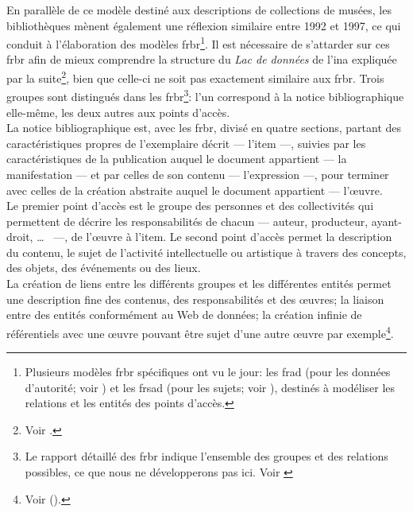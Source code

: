 En parallèle de ce modèle destiné aux descriptions de collections de musées, les bibliothèques mènent également une réflexion similaire entre 1992 et 1997, ce qui conduit à l'élaboration des modèles \ac{frbr}\footnote{Plusieurs modèles \ac{frbr} spécifiques ont vu le jour: les \ac{frad} (pour les données d'autorité; voir \cite{federation_internationale_des_associations_de_bibliothecaires_et_de_bibliotheques_fonctionnalites_2010}) et les \ac{frsad} (pour les sujets; voir \cite{federation_internationale_des_associations_de_bibliothecaires_et_de_bibliotheques_fonctionnalites_2010-1}), destinés à modéliser les relations et les entités des points d'accès.}. 
Il est nécessaire de s'attarder sur ces \ac{frbr} afin de mieux comprendre la structure du \textit{Lac de données} de l'\ac{ina} expliquée par la suite\footnote{Voir .}, bien que celle-ci ne soit pas exactement similaire aux \ac{frbr}.
Trois groupes sont distingués dans les \ac{frbr}\footnote{Le rapport détaillé des \ac{frbr} indique l'ensemble des groupes et des relations possibles, ce que nous ne développerons pas ici. Voir \cite{federation_internationale_des_associations_de_bibliothecaires_et_de_bibliotheques_fonctionnalites_2012}}: l'un correspond à la notice bibliographique elle-même, les deux autres aux points d'accès.\\

La notice bibliographique est, avec les \ac{frbr}, divisé en quatre sections, partant des caractéristiques propres de l'exemplaire décrit --- l'item ---, suivies par les caractéristiques de la publication auquel le document appartient --- la manifestation --- et par celles de son contenu --- l'expression ---, pour terminer avec celles de la création abstraite auquel le document appartient --- l'œuvre.\\

Le premier point d'accès est le groupe des personnes et des collectivités qui permettent de décrire les responsabilités de chacun --- auteur, producteur, ayant-droit, \dots ~ ---, de l'œuvre à l'item. Le second point d'accès permet la description du contenu, le sujet de l'activité intellectuelle ou artistique à travers des concepts, des objets, des événements ou des lieux.\\

La création de liens entre les différents groupes et les différentes entités permet une description fine des contenus, des responsabilités et des œuvres; la liaison entre des entités conformément au Web de données; la création infinie de référentiels avec une œuvre pouvant être sujet d'une autre œuvre par exemple\footnote{Voir  ().}.\\

